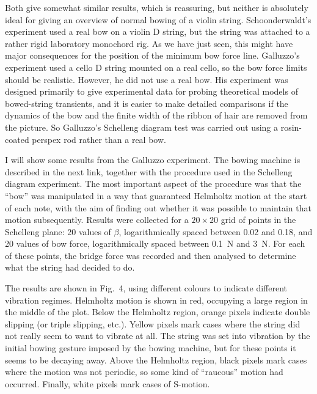   Both give somewhat similar results, which is reassuring, but neither is 
  absolutely ideal for giving an overview of normal bowing of a violin string. 
  Schoonderwaldt’s experiment used a real bow on a violin D string, but the 
  string was attached to a rather rigid laboratory monochord rig. As we have 
  just seen, this might have major consequences for the position of the minimum 
  bow force line. Galluzzo’s experiment used a cello D string mounted on a real 
  cello, so the bow force limits should be realistic. However, he did not use a 
  real bow. His experiment was designed primarily to give experimental data for 
  probing theoretical models of bowed-string transients, and it is easier to 
  make detailed comparisons if the dynamics of the bow and the finite width of 
  the ribbon of hair are removed from the picture. So Galluzzo’s Schelleng 
  diagram test was carried out using a rosin-coated perspex rod rather than a 
  real bow. 

  I will show some results from the Galluzzo experiment. The bowing machine is 
  described in the next link, together with the procedure used in the Schelleng 
  diagram experiment. The most important aspect of the procedure was that the 
  ``bow'' was manipulated in a way that guaranteed Helmholtz motion at the 
  start of each note, with the aim of finding out whether it was possible to 
  maintain that motion subsequently. Results were collected for a $20 \times 
  20$ grid of points in the Schelleng plane: 20 values of $\beta$, 
  logarithmically spaced between 0.02 and 0.18, and 20 values of bow force, 
  logarithmically spaced between 0.1~N and 3~N. For each of these points, the 
  bridge force was recorded and then analysed to determine what the string had 
  decided to do. 


  The results are shown in Fig.\ 4, using different colours to indicate 
  different vibration regimes. Helmholtz motion is shown in red, occupying a 
  large region in the middle of the plot. Below the Helmholtz region, orange 
  pixels indicate double slipping (or triple slipping, etc.). Yellow pixels 
  mark cases where the string did not really seem to want to vibrate at all. 
  The string was set into vibration by the initial bowing gesture imposed by 
  the bowing machine, but for these points it seems to be decaying away. Above 
  the Helmholtz region, black pixels mark cases where the motion was not 
  periodic, so some kind of “raucous” motion had occurred. Finally, white 
  pixels mark cases of S-motion. 

